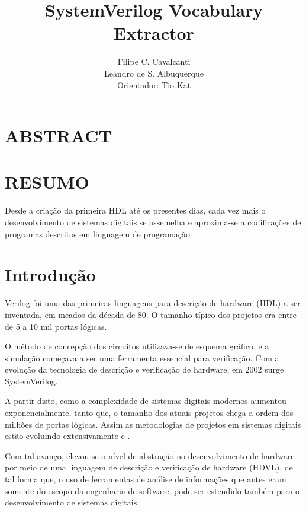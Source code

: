 \documentclass[12pt, twocolumn, a4paper]{article}
\begin{document}
	\title{SystemVerilog Vocabulary Extractor}
	\author{Filipe C. Cavalcanti\\ Leandro de S. Albuquerque\\
	Orientador: Tio Kat}
	\maketitle
	
	\section{ABSTRACT}
	
	\section{RESUMO}
	\quad Desde a criação da primeira HDL até os presentes dias, cada vez mais o desenvolvimento de sistemas digitais se assemelha e aproxima-se a codificações de programas descritos em linguagem de programação  
	
	\section{Introdução}

\quad Verilog foi uma das primeiras linguagens para descrição de hardware (HDL) a ser inventada, em meados da década de 80. O tamanho típico dos projetos era entre de 5 a 10 mil portas lógicas. 

O método de concepção dos circuitos utilizava-se de esquema gráfico, e a simulação começava a ser uma ferramenta essencial para verificação\cite{sutherland2006}. Com a evolução da tecnologia de descrição e verificação de hardware, em 2002 surge SystemVerilog. 

A partir disto, como a complexidade de sistemas digitais modernos aumentou exponencialmente, tanto que, o tamanho dos atuais projetos chega a ordem dos milhões de portas lógicas. Assim as metodologias de projetos em sistemas digitais estão evoluindo extensivamente \cite{Marc-Andre} e \cite{Hahanov2008}.

Com tal avanço, elevou-se o nível de abstração no desenvolvimento de hardware por meio de uma linguagem de descrição e verificação de hardware (HDVL), de tal forma que, o uso de ferramentas de análise de informações que antes eram somente do escopo da engenharia de software, pode ser estendido também para o desenvolvimento de sistemas digitais.
\end{document}
